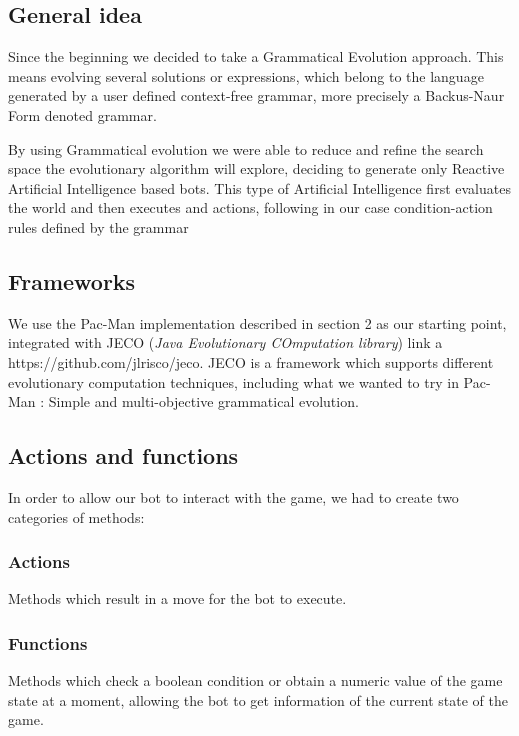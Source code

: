 \documentclass{llncs}
\newcommand{\paco}{Pac-Man }
\begin{document}
\subsection{General idea}
Since the beginning we decided to take a Grammatical Evolution approach. This means evolving several solutions or expressions, which belong to the language generated by a user defined context-free grammar, more precisely a Backus-Naur Form denoted grammar. 

By using Grammatical evolution we were able to reduce and refine the search space the evolutionary algorithm will explore, deciding to generate only Reactive Artificial Intelligence based bots. This type of Artificial Intelligence first evaluates the world and then executes and actions, following in our case condition-action rules defined by the grammar

\subsection{Frameworks}
We use the \paco implementation described in section 2 as our starting point, integrated with JECO (\textit{Java Evolutionary COmputation library}) {\color{red} link a https://github.com/jlrisco/jeco}. JECO is a framework which supports different evolutionary computation techniques, including what we wanted to try in \paco: Simple and multi-objective grammatical evolution.


\subsection{Actions and functions}
In order to allow our bot to interact with the game, we had to create two categories of methods:

\subsubsection{Actions}
Methods which result in a move for the bot to execute.
\subsubsection{Functions}
Methods which check a boolean condition or obtain a numeric value of the game state at a moment, allowing the bot to get information of the current state of the game.
\end{document}
